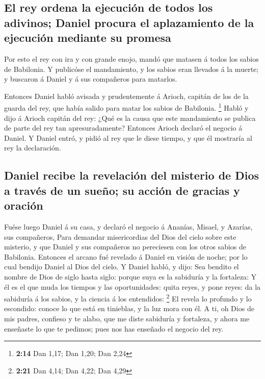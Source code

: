 \hypertarget{el-rey-ordena-la-ejecuciuxf3n-de-todos-los-adivinos-daniel-procura-el-aplazamiento-de-la-ejecuciuxf3n-mediante-su-promesa}{%
\subsection{El rey ordena la ejecución de todos los adivinos; Daniel
procura el aplazamiento de la ejecución mediante su
promesa}\label{el-rey-ordena-la-ejecuciuxf3n-de-todos-los-adivinos-daniel-procura-el-aplazamiento-de-la-ejecuciuxf3n-mediante-su-promesa}}

 Por esto el rey con ira y con grande enojo, mandó que
matasen á todos los sabios de Babilonia.  Y publicóse el
mandamiento, y los sabios eran llevados á la muerte; y buscaron á Daniel
y á sus compañeros para matarlos.

 Entonces Daniel habló avisada y prudentemente á Arioch,
capitán de los de la guarda del rey, que había salido para matar los
sabios de Babilonia. \footnote{\textbf{2:14} Dan 1,17; Dan 1,20; Dan
  2,24}  Habló y dijo á Arioch capitán del rey: ¿Qué es
la causa que este mandamiento se publica de parte del rey tan
apresuradamente? Entonces Arioch declaró el negocio á Daniel.
 Y Daniel entró, y pidió al rey que le diese tiempo, y
que él mostraría al rey la declaración.

\hypertarget{daniel-recibe-la-revelaciuxf3n-del-misterio-de-dios-a-travuxe9s-de-un-sueuxf1o-su-acciuxf3n-de-gracias-y-oraciuxf3n}{%
\subsection{Daniel recibe la revelación del misterio de Dios a través de
un sueño; su acción de gracias y
oración}\label{daniel-recibe-la-revelaciuxf3n-del-misterio-de-dios-a-travuxe9s-de-un-sueuxf1o-su-acciuxf3n-de-gracias-y-oraciuxf3n}}

 Fuése luego Daniel á su casa, y declaró el negocio á
Ananías, Misael, y Azarías, sus compañeros,  Para
demandar misericordias del Dios del cielo sobre este misterio, y que
Daniel y sus compañeros no pereciesen con los otros sabios de Babilonia.
 Entonces el arcano fué revelado á Daniel en visión de
noche; por lo cual bendijo Daniel al Dios del cielo.  Y
Daniel habló, y dijo: Sea bendito el nombre de Dios de siglo hasta
siglo: porque suya es la sabiduría y la fortaleza:  Y él
es el que muda los tiempos y las oportunidades: quita reyes, y pone
reyes: da la sabiduría á los sabios, y la ciencia á los entendidos:
\footnote{\textbf{2:21} Dan 4,14; Dan 4,22; Dan 4,29}  El
revela lo profundo y lo escondido: conoce lo que está en tinieblas, y la
luz mora con él.  A ti, oh Dios de mis padres, confieso y
te alabo, que me diste sabiduría y fortaleza, y ahora me enseñaste lo
que te pedimos; pues nos has enseñado el negocio del rey.

